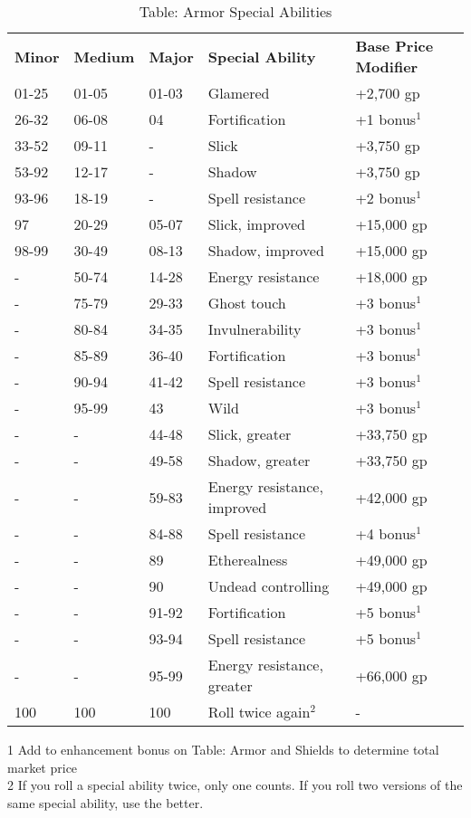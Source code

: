 \begin{table}[]
\sffamily
\caption{Table: Armor Special Abilities}
\begin{tabular}{lllll}
\textbf{Minor} & \textbf{Medium} & \textbf{Major} & \textbf{Special Ability} & \textbf{Base Price Modifier}\\
01-25 & 01-05 & 01-03 & Glamered & +2,700 gp\\
26-32 & 06-08 & 04 & Fortification & +1 bonus\(^{1}\)\\
33-52 & 09-11 & - & Slick & +3,750 gp\\
53-92 & 12-17 & - & Shadow & +3,750 gp\\
93-96 & 18-19 & - & Spell resistance & +2 bonus\(^{1}\)\\
97 & 20-29 & 05-07 & Slick, improved & +15,000 gp\\
98-99 & 30-49 & 08-13 & Shadow, improved & +15,000 gp\\
- & 50-74 & 14-28 & Energy resistance & +18,000 gp\\
- & 75-79 & 29-33 & Ghost touch & +3 bonus\(^{1}\)\\
- & 80-84 & 34-35 & Invulnerability & +3 bonus\(^{1}\)\\
- & 85-89 & 36-40 & Fortification & +3 bonus\(^{1}\)\\
- & 90-94 & 41-42 & Spell resistance & +3 bonus\(^{1}\)\\
- & 95-99 & 43 & Wild & +3 bonus\(^{1}\)\\
- & - & 44-48 & Slick, greater & +33,750 gp\\
- & - & 49-58 & Shadow, greater & +33,750 gp\\
- & - & 59-83 & Energy resistance, improved & +42,000 gp \\
- & - & 84-88 & Spell resistance & +4 bonus\(^{1}\)\\
- & - & 89 & Etherealness & +49,000 gp\\
- & - & 90 & Undead controlling & +49,000 gp\\
- & - & 91-92 & Fortification & +5 bonus\(^{1}\)\\
- & - & 93-94 & Spell resistance & +5 bonus\(^{1}\)\\
- & - & 95-99 & Energy resistance, greater & +66,000 gp \\
100 & 100 & 100 & Roll twice again\(^{2}\) & -\\
\end{tabular}
1 Add to enhancement bonus on Table: Armor and Shields to determine total market price\\
2 If you roll a special ability twice, only one counts. If you roll two versions of the same special ability, use the better.\\
\end{table}

